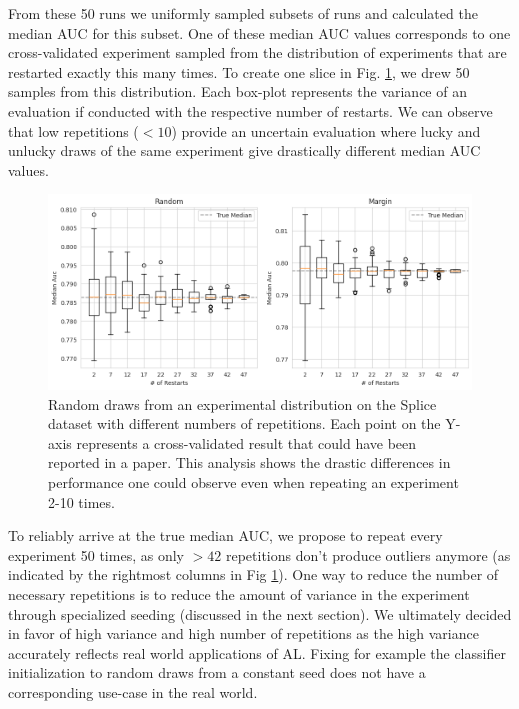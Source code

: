 \documentclass[]{article}
\begin{document}
From these 50 runs we uniformly sampled subsets of runs and calculated the median AUC for this subset.
One of these median AUC values corresponds to one cross-validated experiment sampled from the distribution of experiments that are restarted exactly this many times.
To create one slice in Fig. \ref{fig:restarts}, we drew 50 samples from this distribution.
Each box-plot represents the variance of an evaluation if conducted with the respective number of restarts.
We can observe that low repetitions ($<10$) provide an uncertain evaluation where lucky and unlucky draws of the same experiment give drastically different median AUC values.
\begin{figure}
	\centering
	\includegraphics[width=\linewidth]{img/ablation_restarts}
	\caption{Random draws from an experimental distribution on the Splice dataset with different numbers of repetitions. Each point on the Y-axis represents a cross-validated result that could have been reported in a paper. This analysis shows the drastic differences in performance one could observe even when repeating an experiment 2-10 times.}
	\label{fig:restarts}
\end{figure}
To reliably arrive at the true median AUC, we propose to repeat every experiment 50 times, as only $>42$ repetitions don't produce outliers anymore (as indicated by the rightmost columns in Fig \ref{fig:restarts}).
One way to reduce the number of necessary repetitions is to reduce the amount of variance in the experiment through specialized seeding (discussed in the next section).
We ultimately decided in favor of high variance and high number of repetitions as the high variance accurately reflects real world applications of AL.
Fixing for example the classifier initialization to random draws from a constant seed does not have a corresponding use-case in the real world.


\end{document}
